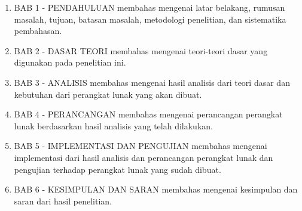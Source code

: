 \begin{enumerate}
	\item BAB 1 - PENDAHULUAN membahas mengenai latar belakang, rumusan masalah, tujuan, batasan masalah, metodologi penelitian, dan sistematika pembahasan.
	\item BAB 2 - DASAR TEORI membahas mengenai teori-teori dasar yang digunakan pada penelitian ini.
	\item BAB 3 - ANALISIS membahas mengenai hasil analisis dari teori dasar dan kebutuhan dari perangkat lunak yang akan dibuat.
	\item BAB 4 - PERANCANGAN membahas mengenai perancangan perangkat lunak berdasarkan hasil analisis yang telah dilakukan.
	\item BAB 5 - IMPLEMENTASI DAN PENGUJIAN membahas mengenai implementasi dari hasil analisis dan perancangan perangkat lunak dan pengujian terhadap perangkat lunak yang sudah dibuat.
	\item BAB 6 - KESIMPULAN DAN SARAN membahas mengenai kesimpulan dan saran dari hasil penelitian.
\end{enumerate}